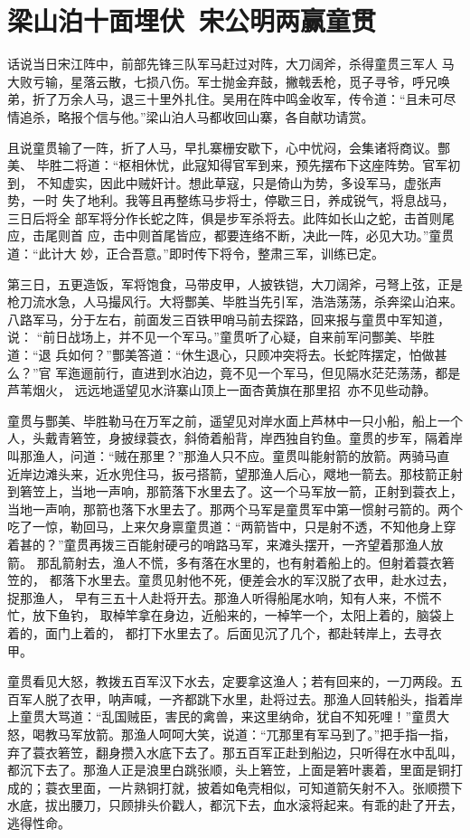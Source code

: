 \chapter{梁山泊十面埋伏~宋公明两赢童贯}

话说当日宋江阵中，前部先锋三队军马赶过对阵，大刀阔斧，杀得童贯三军人
马大败亏输，星落云散，七损八伤。军士抛金弃鼓，撇戟丢枪，觅子寻爷，呼兄唤
弟，折了万余人马，退三十里外扎住。吴用在阵中鸣金收军，传令道：“且未可尽
情追杀，略报个信与他。”梁山泊人马都收回山寨，各自献功请赏。

且说童贯输了一阵，折了人马，早扎寨栅安歇下，心中忧闷，会集诸将商议。酆美、
毕胜二将道：“枢相休忧，此寇知得官军到来，预先摆布下这座阵势。官军初到，
不知虚实，因此中贼奸计。想此草寇，只是倚山为势，多设军马，虚张声势，一时
失了地利。我等且再整练马步将士，停歇三日，养成锐气，将息战马，三日后将全
部军将分作长蛇之阵，俱是步军杀将去。此阵如长山之蛇，击首则尾应，击尾则首
应，击中则首尾皆应，都要连络不断，决此一阵，必见大功。”童贯道：“此计大
妙，正合吾意。”即时传下将令，整肃三军，训练已定。

第三日，五更造饭，军将饱食，马带皮甲，人披铁铠，大刀阔斧，弓弩上弦，正是
枪刀流水急，人马撮风行。大将酆美、毕胜当先引军，浩浩荡荡，杀奔梁山泊来。
八路军马，分于左右，前面发三百铁甲哨马前去探路，回来报与童贯中军知道，说：
“前日战场上，并不见一个军马。”童贯听了心疑，自来前军问酆美、毕胜道：“退
兵如何？”酆美答道：“休生退心，只顾冲突将去。长蛇阵摆定，怕做甚么？”官
军迤逦前行，直进到水泊边，竟不见一个军马，但见隔水茫茫荡荡，都是芦苇烟火，
远远地遥望见水浒寨山顶上一面杏黄旗在那里招，亦不见些动静。

童贯与酆美、毕胜勒马在万军之前，遥望见对岸水面上芦林中一只小船，船上一个
人，头戴青箬笠，身披绿蓑衣，斜倚着船背，岸西独自钓鱼。童贯的步军，隔着岸
叫那渔人，问道：“贼在那里？”那渔人只不应。童贯叫能射箭的放箭。两骑马直
近岸边滩头来，近水兜住马，扳弓搭箭，望那渔人后心，飕地一箭去。那枝箭正射
到箬笠上，当地一声响，那箭落下水里去了。这一个马军放一箭，正射到蓑衣上，
当地一声响，那箭也落下水里去了。那两个马军是童贯军中第一惯射弓箭的。两个
吃了一惊，勒回马，上来欠身禀童贯道：“两箭皆中，只是射不透，不知他身上穿
着甚的？”童贯再拨三百能射硬弓的哨路马军，来滩头摆开，一齐望着那渔人放箭。
那乱箭射去，渔人不慌，多有落在水里的，也有射着船上的。但射着蓑衣箬笠的，
都落下水里去。童贯见射他不死，便差会水的军汉脱了衣甲，赴水过去，捉那渔人，
早有三五十人赴将开去。那渔人听得船尾水响，知有人来，不慌不忙，放下鱼钓，
取棹竿拿在身边，近船来的，一棹竿一个，太阳上着的，脑袋上着的，面门上着的，
都打下水里去了。后面见沉了几个，都赴转岸上，去寻衣甲。

童贯看见大怒，教拨五百军汉下水去，定要拿这渔人；若有回来的，一刀两段。五
百军人脱了衣甲，呐声喊，一齐都跳下水里，赴将过去。那渔人回转船头，指着岸
上童贯大骂道：“乱国贼臣，害民的禽兽，来这里纳命，犹自不知死哩！”童贯大
怒，喝教马军放箭。那渔人呵呵大笑，说道：“兀那里有军马到了。”把手指一指，
弃了蓑衣箬笠，翻身攒入水底下去了。那五百军正赴到船边，只听得在水中乱叫，
都沉下去了。那渔人正是浪里白跳张顺，头上箬笠，上面是箬叶裹着，里面是铜打
成的；蓑衣里面，一片熟铜打就，披着如龟壳相似，可知道箭矢射不入。张顺攒下
水底，拔出腰刀，只顾排头价戳人，都沉下去，血水滚将起来。有乖的赴了开去，
逃得性命。

